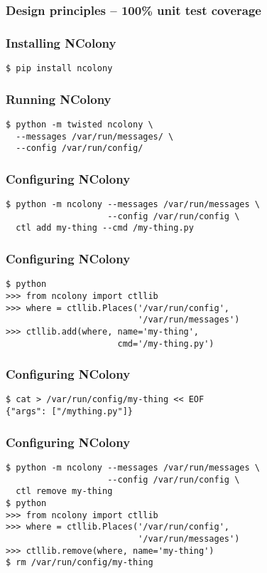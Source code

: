 \documentclass{beamer}
\begin{document}
\begin{frame}
\frametitle{Design principles -- 100\% unit test coverage}
\end{frame}

\begin{frame}[fragile]
\frametitle{Installing NColony}
\begin{lstlisting}
$ pip install ncolony
\end{lstlisting}
\end{frame}

\begin{frame}[fragile]
\frametitle{Running NColony}
\begin{lstlisting}
$ python -m twisted ncolony \
  --messages /var/run/messages/ \
  --config /var/run/config/
\end{lstlisting}
\end{frame}

\begin{frame}[fragile]
\frametitle{Configuring NColony}
\begin{lstlisting}
$ python -m ncolony --messages /var/run/messages \
                    --config /var/run/config \
  ctl add my-thing --cmd /my-thing.py
\end{lstlisting}
\end{frame}

\begin{frame}[fragile]
\frametitle{Configuring NColony}
\begin{lstlisting}
$ python
>>> from ncolony import ctllib
>>> where = ctllib.Places('/var/run/config',
                          '/var/run/messages')
>>> ctllib.add(where, name='my-thing',
                      cmd='/my-thing.py')
\end{lstlisting}
\end{frame}

\begin{frame}[fragile]
\frametitle{Configuring NColony}
\begin{lstlisting}
$ cat > /var/run/config/my-thing << EOF
{"args": ["/mything.py"]}
\end{lstlisting}
\end{frame}

\begin{frame}[fragile]
\frametitle{Configuring NColony}
\begin{lstlisting}
$ python -m ncolony --messages /var/run/messages \
                    --config /var/run/config \
  ctl remove my-thing
$ python
>>> from ncolony import ctllib
>>> where = ctllib.Places('/var/run/config',
                          '/var/run/messages')
>>> ctllib.remove(where, name='my-thing')
$ rm /var/run/config/my-thing
\end{lstlisting}
\end{frame}
\end{document}

